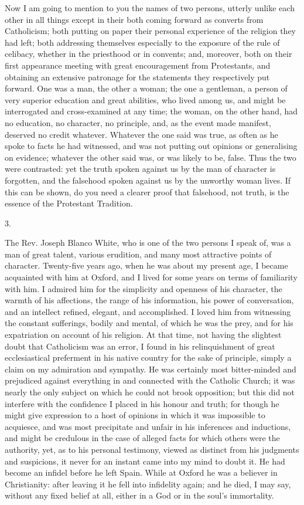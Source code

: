 Now I am going to mention to you the names of two
persons, utterly unlike each other in all things except
in their both coming forward as converts from
Catholicism; both putting on paper their personal experience of the religion they had left; both addressing
themselves especially to the exposure of the rule of
celibacy, whether in the priesthood or in convents; and,
moreover, both on their first appearance meeting with
great encouragement from Protestants, and obtaining an
extensive patronage for the statements they respectively
put forward. One was a man, the other a woman; the one a
gentleman, a person of very superior education and great
abilities, who lived among us, and might be interrogated
and cross-examined at any time; the woman, on the other
hand, had no education, no character, no principle, and,
as the event made manifest, deserved no credit whatever.
Whatever the one said was true, as often as he spoke to
facts he had witnessed, and was not putting out opinions
or generalising on evidence; whatever the other said was,
or was likely to be, false. Thus the two were contrasted:
yet the truth spoken against us by the man of character
is forgotten, and the falsehood spoken against us by the
unworthy woman lives. If this can be shown, do you need a
clearer proof that falsehood, not truth, is the essence
of the Protestant Tradition.

3.

The Rev. Joseph Blanco White, who is one of the two
persons I speak of, was a man of great talent, various
erudition, and many most attractive points of character.
Twenty-five years ago, when he was about my present age,
I became acquainted with him at Oxford, and I lived for
some years on terms of familiarity with him. I admired
him for the simplicity and openness of his character, the
warmth of his affections, the range of his information,
his power of conversation, and an intellect refined,
elegant, and accomplished. I loved him from witnessing
the constant sufferings, bodily and mental, of which he
was the prey, and for his expatriation on account of his
religion. At that time, not having the slightest doubt
that Catholicism was an error, I found in his
relinquishment of great ecclesiastical preferment in his
native country for the sake of principle, simply a claim
on my admiration and sympathy. He was certainly most
bitter-minded and prejudiced against everything in and
connected with the Catholic Church; it was nearly the
only subject on which he could not brook opposition; but
this did not interfere with the confidence I placed in
his honour and truth; for though he might give expression
to a host of opinions in which it was impossible to
acquiesce, and was most precipitate and unfair in his
inferences and inductions, and might be credulous in the
case of alleged facts for which others were the
authority, yet, as to his personal testimony, viewed as
distinct from his judgments and suspicions, it never for
an instant came into my mind to doubt it. He had become
an infidel before he left Spain. While at Oxford he was a
believer in Christianity: after leaving it he fell into
infidelity again; and he died, I may say, without any
fixed belief at all, either in a God or in the soul's
immortality.

